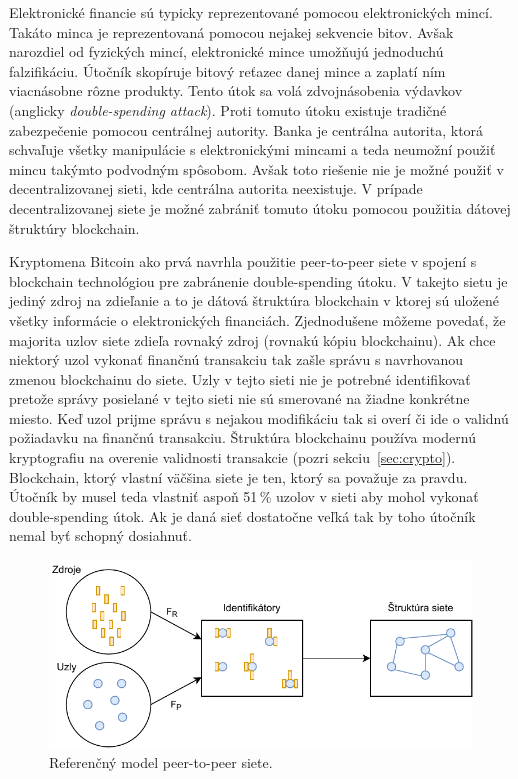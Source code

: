 Elektronické financie sú typicky reprezentované pomocou elektronických mincí. Takáto minca je reprezentovaná pomocou nejakej sekvencie bitov. Avšak narozdiel od fyzických mincí, elektronické mince umožňujú jednoduchú falzifikáciu. Útočník skopíruje bitový reťazec danej mince a zaplatí ním viacnásobne rôzne produkty. Tento útok sa volá zdvojnásobenia výdavkov (anglicky \textit{double-spending attack}). Proti tomuto útoku existuje tradičné zabezpečenie pomocou centrálnej autority. Banka je centrálna autorita, ktorá schvaľuje všetky manipulácie s elektronickými mincami a teda neumožní použiť mincu takýmto podvodným spôsobom. Avšak toto riešenie nie je možné použiť v decentralizovanej sieti, kde centrálna autorita neexistuje. V prípade decentralizovanej siete je možné zabrániť tomuto útoku pomocou použitia dátovej štruktúry blockchain.~\cite{doubleSpending}

Kryptomena Bitcoin ako prvá navrhla použitie peer-to-peer siete v spojení s blockchain technológiou pre zabránenie double-spending útoku. V takejto sietu je jediný zdroj na zdieľanie a to je dátová štruktúra blockchain v ktorej sú uložené všetky informácie o elektronických financiách. Zjednodušene môžeme povedať, že majorita uzlov siete zdieľa rovnaký zdroj (rovnakú kópiu blockchainu). Ak chce niektorý uzol vykonať finančnú transakciu tak zašle správu s navrhovanou zmenou blockchainu do siete. Uzly v tejto sieti nie je potrebné identifikovať pretože správy posielané v tejto sieti nie sú smerované na žiadne konkrétne miesto. Keď uzol prijme správu s nejakou modifikáciu tak si overí či ide o validnú požiadavku na finančnú transakciu. Štruktúra blockchainu používa modernú kryptografiu na overenie validnosti transakcie (pozri sekciu~\ref{sec:crypto}). Blockchain, ktorý vlastní väčšina siete je ten, ktorý sa považuje za pravdu. Útočník by musel teda vlastniť aspoň 51\,\% uzolov v sieti aby mohol vykonať double-spending útok. Ak je daná sieť dostatočne veľká tak by toho útočník nemal byť schopný dosiahnuť.~\cite{satoshiBitcoin}

\begin{figure}[bt]
	\centering
	\includegraphics[width=\textwidth]{obrazky-figures/p2p-ref-model.pdf}
	\caption{Referenčný model peer-to-peer siete.~\cite{p2pEssence}}
	\label{img:p2p-ref-model}
\end{figure}

